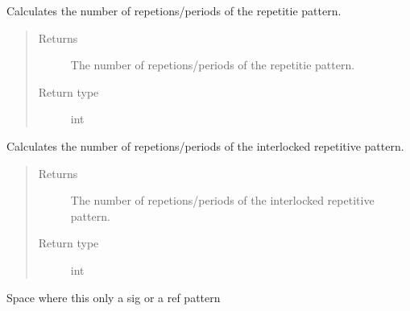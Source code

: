 \documentclass[letterpaper,10pt,english]{sphinxmanual}
\begin{document}
\begin{fulllineitems}
\begin{fulllineitems}
\label{\detokenize{index:calibration_pattern.calibration_pattern.repetitions}}
\sphinxAtStartPar
Calculates the number of repetions/periods of the repetitie pattern.
\begin{quote}\begin{description}
\item[{Returns}] \leavevmode
\sphinxAtStartPar
The number of repetions/periods of the repetitie pattern.

\item[{Return type}] \leavevmode
\sphinxAtStartPar
int

\end{description}\end{quote}

\end{fulllineitems}


\begin{fulllineitems}
\label{\detokenize{index:calibration_pattern.calibration_pattern.repetitions_interlocked}}
\sphinxAtStartPar
Calculates the number of repetions/periods of the interlocked repetitive pattern.
\begin{quote}\begin{description}
\item[{Returns}] \leavevmode
\sphinxAtStartPar
The number of repetions/periods of the interlocked repetitive pattern.

\item[{Return type}] \leavevmode
\sphinxAtStartPar
int

\end{description}\end{quote}

\end{fulllineitems}


\begin{fulllineitems}
\label{\detokenize{index:calibration_pattern.calibration_pattern.sigref_only}}
\sphinxAtStartPar
Space where this only a sig or a ref pattern


\end{fulllineitems}
\end{fulllineitems}
\end{document}
